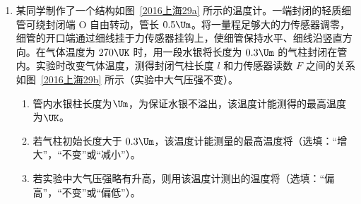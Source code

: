 \documentclass[\gkver]{gaokaozhenti}
\begin{document}
\begin{enumerate}
\item
某同学制作了一个结构如图~\ref{2016上海29a} 所示的温度计。一端封闭的轻质细管可绕封闭端 O 自由转动，管长 $0.5\Um$。将一量程足够大的力传感器调零，细管的开口端通过细线挂于力传感器挂钩上，使细管保持水平、细线沿竖直方向。在气体温度为 $270\UK$ 时，用一段水银将长度为 $0.3\Um$ 的气柱封闭在管内。实验时改变气体温度，测得封闭气柱长度 $l$ 和力传感器读数 $F$ 之间的关系如图~\ref{2016上海29b} 所示（实验中大气压强不变）。
\begin{enumerate}
	\item
	管内水银柱长度为$\Um$，为保证水银不溢出，该温度计能测得的最高温度为$\UK$。
	\item
	若气柱初始长度大于 $0.3\Um$，该温度计能测量的最高温度将（选填：“增大”，“不变”或“减小”）。
	\item
	若实验中大气压强略有升高，则用该温度计测出的温度将（选填：“偏高”，“不变”或“偏低”）。
\end{enumerate}
\twopicture[labelA=2016上海29a, labelB=2016上海29b, numA=（a）, numB=（b）, align=right, wA=2.95cm, wB=4.13cm]
{}
{}
\end{enumerate}
\end{document}
